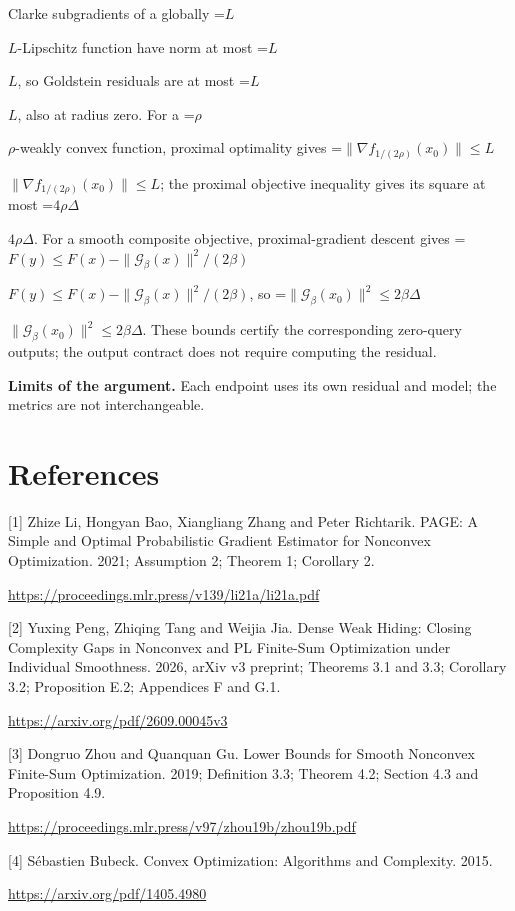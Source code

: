 \documentclass[10pt,a4paper]{article}
\newcommand{\AtlasMath}[1]{\par\begingroup\centering\setbox0=\hbox{$\displaystyle #1$}\ifdim\wd0>1.4\linewidth\typeout{ATLAS WIDE FORMULA: \the\wd0}\fi\ifdim\wd0>\linewidth\resizebox{\linewidth}{!}{\box0}\else\box0\fi\par\endgroup}
\newcommand{\AtlasInlineMath}[1]{\begingroup\setbox0=\hbox{$#1$}\ifdim\wd0>.4\linewidth\endgroup\AtlasMath{#1}\else\endgroup$#1$\fi}
\begin{document}
Clarke subgradients of a globally \AtlasInlineMath{L}-Lipschitz function have norm at most \AtlasInlineMath{L}, so Goldstein residuals are at most \AtlasInlineMath{L}, also at radius zero. For a \AtlasInlineMath{\rho}-weakly convex function, proximal optimality gives
\AtlasInlineMath{\|\nabla f_{1/(2\rho)}(x_0)\|\le L}; the proximal objective inequality gives its square at most \AtlasInlineMath{4\rho\Delta}.
For a smooth composite objective, proximal-gradient descent gives
\AtlasInlineMath{F(y)\le F(x)-\|\mathcal G_\beta(x)\|^2/(2\beta)},
so \AtlasInlineMath{\|\mathcal G_\beta(x_0)\|^2\le2\beta\Delta}.
These bounds certify the corresponding zero-query outputs; the output contract does not require computing the residual.

\textbf{Limits of the argument.} Each endpoint uses its own residual and model; the metrics are not interchangeable.

\section{References}
[1] Zhize Li, Hongyan Bao, Xiangliang Zhang and Peter Richtarik. PAGE: A Simple and Optimal Probabilistic Gradient Estimator for Nonconvex Optimization. 2021; Assumption 2; Theorem 1; Corollary 2.

\url{https://proceedings.mlr.press/v139/li21a/li21a.pdf}

[2] Yuxing Peng, Zhiqing Tang and Weijia Jia. Dense Weak Hiding: Closing Complexity Gaps in Nonconvex and PL Finite-Sum Optimization under Individual Smoothness. 2026, arXiv v3 preprint; Theorems 3.1 and 3.3; Corollary 3.2; Proposition E.2; Appendices F and G.1.

\url{https://arxiv.org/pdf/2609.00045v3}

[3] Dongruo Zhou and Quanquan Gu. Lower Bounds for Smooth Nonconvex Finite-Sum Optimization. 2019; Definition 3.3; Theorem 4.2; Section 4.3 and Proposition 4.9.

\url{https://proceedings.mlr.press/v97/zhou19b/zhou19b.pdf}

[4] Sébastien Bubeck. Convex Optimization: Algorithms and Complexity. 2015.

\url{https://arxiv.org/pdf/1405.4980}
\end{document}
